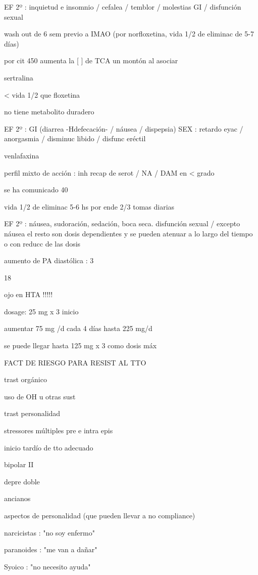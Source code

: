\documentclass{scrbook}
\begin{document}
EF 2º : inquietud e insomnio / cefalea / temblor / molestias GI / disfunción sexual

wash out de 6 sem previo a IMAO (por norfloxetina, vida 1/2 de eliminac de 5-7 días)

por cit 450 aumenta la [ ] de TCA un montón al asociar

sertralina

< vida 1/2 que floxetina

no tiene metabolito duradero

EF 2º : GI (diarrea -Hdefecación- / náusea / dispepsia) SEX : retardo eyac / anorgasmia / disminuc libido / disfunc eréctil

venlafaxina

perfil mixto de acción : inh recap de serot / NA / DAM en < grado

se ha comunicado 40 %

vida 1/2 de eliminac 5-6 hs por ende 2/3 tomas diarias

EF 2º : náusea, sudoración, sedación, boca seca. disfunción sexual / excepto náusea el resto son dosis dependientes y se pueden atenuar a lo largo del tiempo o con reducc de las dosis

aumento de PA diastólica : 3%

18 %

ojo en HTA !!!!!

dosage: 25 mg x 3 inicio

aumentar 75 mg /d cada 4 días hasta 225 mg/d

se puede llegar hasta 125 mg x 3 como dosis máx

FACT DE RIESGO PARA RESIST AL TTO

trast orgánico

uso de OH u otras sust

trast personalidad

stressores múltiples pre e intra epis

inicio tardío de tto adecuado

bipolar II

depre doble

ancianos

aspectos de personalidad (que pueden llevar a no compliance)

narcicistas : "no soy enfermo"

paranoides : "me van a dañar"

Syoico : "no necesito ayuda"
\end{document}
